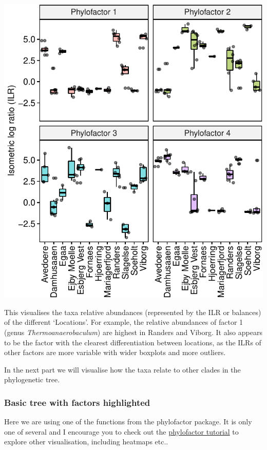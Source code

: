 \documentclass[
]{book}
\begin{document}
\includegraphics{gitbook-demo_files/figure-latex/pfviz1-1.pdf}

This visualises the taxa relative abundances (represented by the ILR or balances) of the different `Locations'. For example, the relative abundances of factor 1 (genus \emph{Thermoanaerobaculum}) are highest in Randers and Viborg. It also appears to be the factor with the clearest differentiation between locations, as the ILRs of other factors are more variable with wider boxplots and more outliers.

In the next part we will visualise how the taxa relate to other clades in the phylogenetic tree.

\hypertarget{basic-tree-with-factors-highlighted}{%
\subsubsection{Basic tree with factors highlighted}\label{basic-tree-with-factors-highlighted}}

Here we are using one of the functions from the phylofactor package. It is only one of several and I encourage you to check out the \href{https://docs.wixstatic.com/ugd/0119a1_099ae20df8424af9a38585dcebc0d45a.pdf}{phylofactor tutorial} to explore other visualisation, including heatmaps etc..
\end{document}
